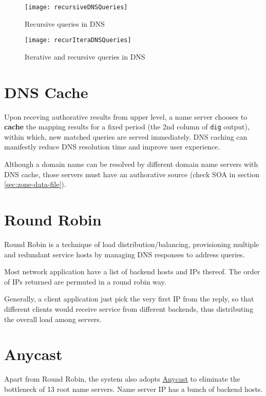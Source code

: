 \begin{figure}[tbp]
  \centering
  \texttt{[image: recursiveDNSQueries]}
  \caption{Recursive queries in DNS}
  \label{fig:recursive-dns-queries}
\end{figure}

\begin{figure}[tbp]
  \centering
  \texttt{[image: recurIteraDNSQueries]}
  \caption{Iterative and recursive queries in DNS}
  \label{fig:itera-recur-quer-dns}
\end{figure}

\section{DNS Cache}
\label{sec:dns-cache}

Upon receving authorative results from upper level, a name server
chooses to \textbf{cache} the mapping results for a fixed period
(the 2nd column of \lstinline|dig| output), within which, new
matched queries are served immediately. DNS caching can manifestly
reduce DNS resolution time and improve user experience.

Although a domain name can be resolved by different domain name
servers with DNS cache, those servers must have an authorative
source (check SOA in section \ref{sec:zone-data-file}).

\section{Round Robin}
\label{sec:dns-round-robin}

Round Robin is a technique of load distribution/balancing,
provisioning multiple and redundant service hosts by managing DNS
responses to address queries.

Most network application have a list of backend hosts and IPs
thereof. The order of IPs returned are permuted in a round robin
way.

Generally, a client application just pick the very first IP from
the reply, so that different clients would receive service from
different backends, thus distributing the overall load among
servers.

\section{Anycast}
\label{sec:dns-anycast}

Apart from Round Robin, the system also adopts
\href{https://en.wikipedia.org/wiki/Anycast}{Anycast} to eliminate
the bottleneck of 13 root name servers. Name server IP has a bunch
of backend hosts.

